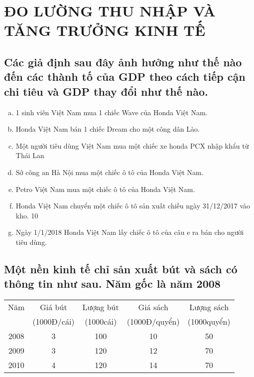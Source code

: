 \chapter{ĐO LƯỜNG THU NHẬP VÀ 
TĂNG TRƯỞNG KINH TẾ}

\section{ Các giả định sau đây ảnh hưởng như thế nào đến các thành tố của GDP theo 
cách tiếp cận chi tiêu và GDP thay đổi như thế nào.}
\begin{enumerate}[a.]
    \item 1 sinh viên Việt Nam mua 1 chiếc Wave của Honda Việt Nam.
    \item Honda Việt Nam bán 1 chiếc Dream cho một công dân Lào.
    \item Một người tiêu dùng Việt Nam mua một chiếc xe honda PCX nhập khẩu từ Thái 
    Lan
    \item Sở công an Hà Nội mua một chiếc ô tô của Honda Việt Nam.
    \item Petro Việt Nam mua một chiếc ô tô của Honda Việt Nam.
    \item Honda Việt Nam chuyển một chiếc ô tô sản xuất chiều ngày 31/12/2017 vào kho.
    10
    \item Ngày 1/1/2018 Honda Việt Nam lấy chiếc ô tô của câu e ra bán cho người tiêu 
    dùng.
\end{enumerate}

\section{ Một nền kinh tế chỉ sản xuất bút và sách có thông tin như sau. Năm gốc là năm
  2008 }

\begin{tabular}{|c|c|c|c|c|}
  \hline
  Năm  & Giá bút     & Lượng bút & Giá sách      & Lượng sách  \\
       & (1000Đ/cái) & (1000cái) & (1000Đ/quyển) & (1000quyển) \\
  \hline
  2008 & 3           & 100       & 10            & 50          \\
  \hline
  2009 & 3           & 120       & 12            & 70          \\
  \hline
  2010 & 4           & 120       & 14            & 70          \\
  \hline
\end{tabular}

